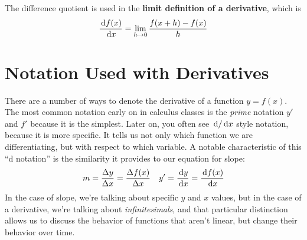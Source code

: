 The difference quotient is used in the \textbf{limit definition of a derivative}, which is
\begin{equation}
  \label{eq:limitdef}
  \frac{\,\mathrm{d} f(x)}{\,\mathrm{d} x}=\lim_{h \to 0} \frac{f(x+h)-f(x)}{h}
\end{equation}
%
%
%

\section{Notation Used with Derivatives}

There are a number of ways to denote the derivative of a function $y=f(x)$. The most common notation early on in calculus classes is the \emph{prime} notation $y'$ and $f'$ because it is the simplest. Later on, you often see $\,\mathrm{d}/\,\mathrm{d} x$ style notation, because it is more specific. It tells us not only which function we are differentiating, but with respect to which variable. A notable characteristic of this ``d notation'' is the similarity it provides to our equation for slope:
\begin{align*}
  &m=\frac{\Delta y}{\Delta x}=\frac{\Delta f(x)}{\Delta x} &y'=\frac{\,\mathrm{d} y}{\,\mathrm{d} x}=\frac{\,\mathrm{d} f(x)}{\,\mathrm{d} x}
\end{align*}
In the case of slope, we're talking about specific $y$ and $x$ values, but in the case of a derivative, we're talking about \emph{infinitesimals}, and that particular distinction allows us to discuss the behavior of functions that aren't linear, but change their behavior over time.

